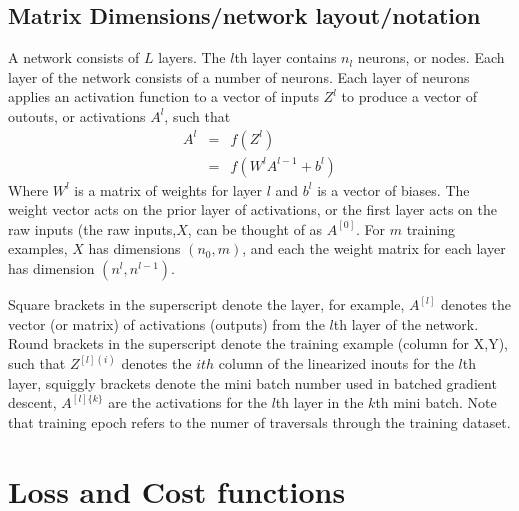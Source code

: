 \documentclass{article}
\begin{document}
\subsection{Matrix Dimensions/network layout/notation}
A network consists of $L$ layers. The $l$th layer contains $n_l$ neurons, or nodes. Each layer of the network consists of a number of neurons. Each layer of neurons applies an activation function to a vector of inputs $Z^l$ to produce a vector of outouts, or activations $A^l$, such that
\begin{eqnarray*}
A^l &=& f(Z^l) \\
& =& f(W^lA^{l-1} + b^l)
\end{eqnarray*}
Where $W^l$ is a matrix of weights for layer $l$ and $b^l$ is a vector of biases. The weight vector acts on the prior layer of activations, or the first layer acts on the raw inputs (the raw inputs,$X$, can be thought of as $A^{[0]}$. For $m$ training examples, $X$ has dimensions $(n_0,m)$, and each the weight matrix for each layer has dimension $(n^l,n^{l-1})$. 



Square brackets in the superscript denote the layer, for example, $A^{[l]}$ denotes the vector (or matrix) of activations (outputs) from the $l$th layer of the network. Round brackets in the superscript denote the training example (column for X,Y), such that $Z^{[l](i)}$ denotes the $ith$ column of the linearized inouts for the $l$th layer, squiggly brackets denote the mini batch number used in batched gradient descent, $A^{[l]\{k\}}$ are the activations for the $l$th layer in the $k$th mini batch.
Note that training epoch refers to the numer of traversals through the training dataset.





\section{Loss and Cost functions}
\end{document}

